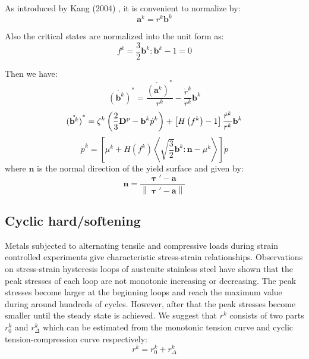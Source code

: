 As introduced by Kang (2004) \cite{kang2004visco}, it is convenient to normalize by:
\begin{equation}
\label{Equ:ak1}
{{\mathbf{a}}^k} = {r^k}{{\mathbf{b}}^k}
\end{equation}

Also the critical states are normalized into the unit form as:
\begin{equation}
{f^k} = \frac{3}{2}{{\mathbf{b}}^k}:{{\mathbf{b}}^k} - 1 = 0
\end{equation}

Then we have:
\begin{equation}
\mathring{\left({\mathbf{b}}^{k}\right)}^* = \frac{\mathring{\left({\mathbf{a}}^{k}\right)}^*}{{{r^k}}} - \frac{{{{\dot r}^k}}}{{{r^k}}}{{\mathbf{b}}^k}
\end{equation}
\begin{equation}
\mathring{\left({\mathbf{b}}^{k}\right)}^* = {\zeta ^k}\left( {\frac{2}{3}{{\mathbf{D}}^{\rm{p}}} - {{\mathbf{b}}^k}{{\dot p}^k}} \right) + \left[ {H\left( {{f^k}} \right) - 1} \right]\frac{{{{\dot r}^k}}}{{{r^k}}}{{\mathbf{b}}^k}
\end{equation}
\begin{equation}
{\dot p^k} = \left[ {{\mu ^k} + H\left( {{f^k}} \right)\left\langle {\sqrt {\frac{3}{2}} {{\mathbf{b}}^k}:{\mathbf{n}} - {\mu ^k}} \right\rangle } \right]\dot p
\end{equation}
where ${\mathbf{n}}$ is the normal direction of the yield surface and given by:
\begin{equation}
{\mathbf{n}} = \frac{{{\bm{\uptau}'} - {\mathbf{a}}}}{{\left\| {{\bm{\uptau}}' - {\mathbf{a}}} \right\|}}
\end{equation}

\subsection{Cyclic hard/softening}
\noindent
Metals subjected to alternating tensile and compressive loads during strain controlled experiments give characteristic stress-strain relationships. Observations on stress-strain hysteresis loops of austenite stainless steel have shown that the peak stresses of each loop are not monotonic increasing or decreasing. The peak stresses become larger at the beginning loops and reach the maximum value during around hundreds of cycles. However, after that the peak stresses become smaller until the steady state is achieved. We suggest that $r^k$ consists of two parts $r_0^k$ and $r_{\Delta}^k$ which can be estimated from the monotonic tension curve and cyclic tension-compression curve respectively:
\begin{equation}
\label{Equ:rk1}
{r^k} = r_0^k + r_\Delta ^k
\end{equation}

